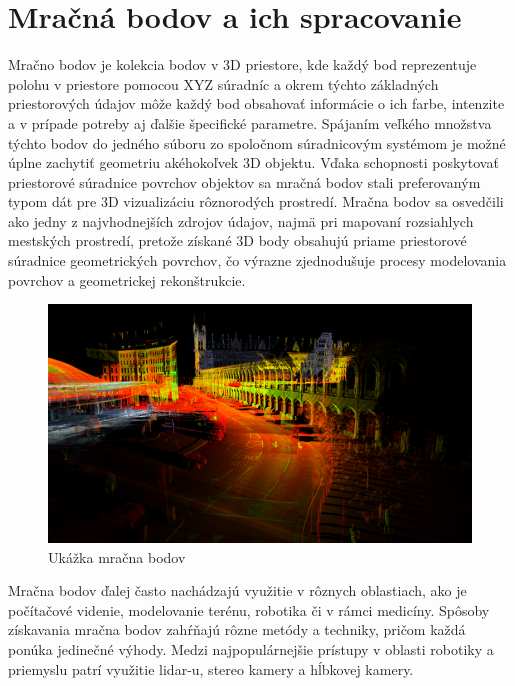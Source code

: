 \section{Mračná bodov a ich spracovanie}
\noindent Mračno bodov je kolekcia bodov v 3D priestore, kde každý bod reprezentuje polohu v priestore pomocou XYZ súradníc a okrem týchto základných priestorových údajov môže každý bod obsahovať informácie o ich farbe, intenzite a v prípade potreby aj ďalšie špecifické parametre. Spájaním veľkého množstva týchto bodov do jedného súboru zo spoločnom súradnicovým systémom je možné úplne zachytiť geometriu akéhokoľvek 3D objektu. Vďaka schopnosti poskytovať priestorové súradnice povrchov objektov sa mračná bodov stali preferovaným typom dát pre 3D vizualizáciu rôznorodých prostredí. Mračna bodov sa osvedčili ako jedny z najvhodnejších zdrojov údajov, najmä pri mapovaní rozsiahlych mestských prostredí, pretože získané 3D body obsahujú priame priestorové súradnice geometrických povrchov, čo výrazne zjednodušuje procesy modelovania povrchov a geometrickej rekonštrukcie. \cite{voxel_grid} 
\newline\begin{figure}[!htbp]
  \centering
  \includegraphics[width=15cm]{img/ukazka_pc.png}
  \caption{Ukážka mračna bodov}
  \label{vzhladobr}
\end{figure}	
\newline\indent Mračna bodov ďalej často nachádzajú využitie v rôznych oblastiach, ako je počítačové videnie, modelovanie terénu, robotika či v rámci medicíny. Spôsoby získavania mračna bodov zahŕňajú rôzne metódy a techniky, pričom každá ponúka jedinečné výhody. Medzi najpopulárnejšie prístupy v oblasti robotiky a priemyslu patrí využitie \acrshort{lidar}-u, stereo kamery a hĺbkovej kamery.

